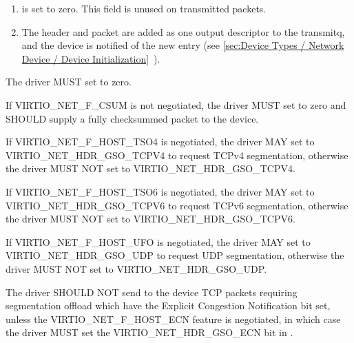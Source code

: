 \begin{enumerate}
\begin{itemize}
  \item {} is the maximum size of each packet beyond that
    header (ie. MSS).

  \item If the driver negotiated the VIRTIO_NET_F_HOST_ECN feature,
    the VIRTIO_NET_HDR_GSO_ECN bit in 
    indicates that the TCP packet has the ECN bit set\footnote{This case is not handled by some older hardware, so is called out
specifically in the protocol.}.
   \end{itemize}

\item {} is set to zero.  This field is unused on transmitted packets.

\item The header and packet are added as one output descriptor to the
  transmitq, and the device is notified of the new entry
  (see \ref{sec:Device Types / Network Device / Device Initialization}~).
\end{enumerate}


The driver MUST set  to zero.

If VIRTIO_NET_F_CSUM is not negotiated, the driver MUST set
 to zero and SHOULD supply a fully checksummed
packet to the device.

If VIRTIO_NET_F_HOST_TSO4 is negotiated, the driver MAY set
 to VIRTIO_NET_HDR_GSO_TCPV4 to request TCPv4
segmentation, otherwise the driver MUST NOT set
 to VIRTIO_NET_HDR_GSO_TCPV4.

If VIRTIO_NET_F_HOST_TSO6 is negotiated, the driver MAY set
 to VIRTIO_NET_HDR_GSO_TCPV6 to request TCPv6
segmentation, otherwise the driver MUST NOT set
 to VIRTIO_NET_HDR_GSO_TCPV6.

If VIRTIO_NET_F_HOST_UFO is negotiated, the driver MAY set
 to VIRTIO_NET_HDR_GSO_UDP to request UDP
segmentation, otherwise the driver MUST NOT set
 to VIRTIO_NET_HDR_GSO_UDP.

The driver SHOULD NOT send to the device TCP packets requiring segmentation offload
which have the Explicit Congestion Notification bit set, unless the
VIRTIO_NET_F_HOST_ECN feature is negotiated, in which case the
driver MUST set the VIRTIO_NET_HDR_GSO_ECN bit in
.

